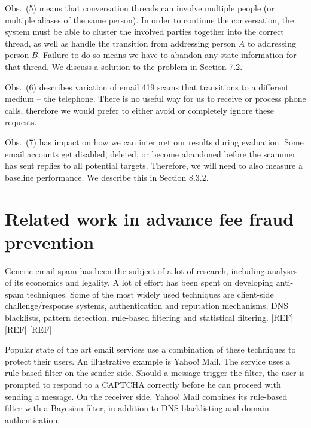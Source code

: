 Obs.~(5) means that conversation threads can involve multiple people (or multiple aliases of the same person). In order to continue the conversation, the system must be able to cluster the involved parties together into the correct thread, as well as handle the transition from addressing person $A$ to addressing person $B$. Failure to do so means we have to abandon any state information for that thread. We discuss a solution to the problem in Section 7.2.

Obs.~(6) describes variation of email 419 scams that transitions to a different medium -- the telephone. There is no useful way for us to receive or process phone calls, therefore we would prefer to either avoid or completely ignore these requests.

Obs.~(7) has impact on how we can interpret our results during evaluation. Some email accounts get disabled, deleted, or become abandoned before the scammer has sent replies to all potential targets. Therefore, we will need to also measure a baseline performance. We describe this in Section 8.3.2.

\section{Related work in advance fee fraud prevention}
Generic email spam has been the subject of a lot of research, including analyses of its economics and legality. A lot of effort has been spent on developing anti-spam techniques. Some of the most widely used techniques are client-side challenge/response systems, authentication and reputation mechanisms, DNS blacklists, pattern detection, rule-based filtering and statistical filtering. [REF] [REF] [REF]

Popular state of the art email services use a combination of these techniques to protect their users. An illustrative example is Yahoo! Mail. The service uses a rule-based filter on the sender side. Should a message trigger the filter, the user is prompted to respond to a CAPTCHA correctly before he can proceed with sending a message. On the receiver side, Yahoo! Mail combines its rule-based filter with a Bayesian filter, in addition to DNS blacklisting and domain authentication. 

